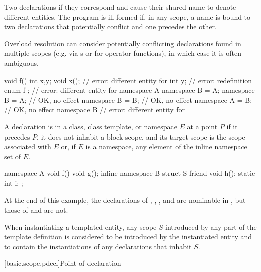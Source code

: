 \pnum
{}%
Two declarations 
if they correspond and
cause their shared name to denote different entities.
The program is ill-formed
if, in any scope, a name is bound to two declarations
that potentially conflict and one precedes the other.
\begin{note}
Overload resolution can consider potentially conflicting declarations
found in multiple scopes
(e.g. via s or for operator functions),
in which case it is often ambiguous.
\end{note}
\begin{example}
\begin{codeblock}
void f() {
  int x,y;
  void x();             // error: different entity for 
  int y;                // error: redefinition
}
enum { f };             // error: different entity for 
namespace A {}
namespace B = A;
namespace B = A;        // OK, no effect
namespace B = B;        // OK, no effect
namespace A = B;        // OK, no effect
namespace B {}          // error: different entity for 
\end{codeblock}
\end{example}

\pnum
{}%
A declaration is 
in a class, class template, or namespace $E$ at a point $P$ if
it precedes $P$,
it does not inhabit a block scope, and
its target scope is the scope associated with $E$ or,
if $E$ is a namespace,
any element of the inline namespace set of $E$.
\begin{example}
\begin{codeblock}
namespace A {
  void f() {void g();}
  inline namespace B {
    struct S {
      friend void h();
      static int i;
    };
  }
}
\end{codeblock}
At the end of this example,
the declarations of , , , and 
are nominable in , but those of  and  are not.
\end{example}

\pnum
When instantiating a templated entity,
any scope $S$ introduced by any part of the template definition is considered
to be introduced by the instantiated entity and
to contain the instantiations of any declarations that inhabit $S$.

[basic.scope.pdecl]{Point of declaration}

